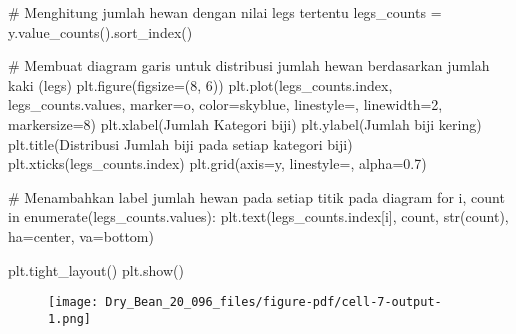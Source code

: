 \documentclass[
  letterpaper,
]{krantz}
\makeatletter
\newenvironment{Shaded}{\begin{snugshade}}{\end{snugshade}}
\newcommand{\BuiltInTok}[1]{\textcolor[rgb]{0.00,0.23,0.31}{#1}}
\newcommand{\CommentTok}[1]{\textcolor[rgb]{0.37,0.37,0.37}{#1}}
\newcommand{\ControlFlowTok}[1]{\textcolor[rgb]{0.00,0.23,0.31}{#1}}
\newcommand{\DecValTok}[1]{\textcolor[rgb]{0.68,0.00,0.00}{#1}}
\newcommand{\FloatTok}[1]{\textcolor[rgb]{0.68,0.00,0.00}{#1}}
\newcommand{\KeywordTok}[1]{\textcolor[rgb]{0.00,0.23,0.31}{#1}}
\newcommand{\NormalTok}[1]{\textcolor[rgb]{0.00,0.23,0.31}{#1}}
\newcommand{\OperatorTok}[1]{\textcolor[rgb]{0.37,0.37,0.37}{#1}}
\newcommand{\StringTok}[1]{\textcolor[rgb]{0.13,0.47,0.30}{#1}}
\newenvironment{kframe}{%
\medskip{}
\setlength{\fboxsep}{.8em}
 \def\at@end@of@kframe{}%
 \ifinner\ifhmode%
  \def\at@end@of@kframe{\end{minipage}}%
  \begin{minipage}{\columnwidth}%
 \fi\fi%
 \def\FrameCommand##1{\hskip\@totalleftmargin \hskip-\fboxsep
 \colorbox{shadecolor}{##1}\hskip-\fboxsep
     \hskip-\linewidth \hskip-\@totalleftmargin \hskip\columnwidth}%
 \MakeFramed {\advance\hsize-\width
   \@totalleftmargin\z@ \linewidth\hsize
   \@setminipage}}%
 {\par\unskip\endMakeFramed%
 \at@end@of@kframe}
\renewenvironment{Shaded}{\begin{kframe}}{\end{kframe}}
\makeatother
\begin{document}
\begin{Shaded}
\begin{Highlighting}[]
\CommentTok{\# Menghitung jumlah hewan dengan nilai legs tertentu}
\NormalTok{legs\_counts }\OperatorTok{=}\NormalTok{ y.value\_counts().sort\_index()}

\CommentTok{\# Membuat diagram garis untuk distribusi jumlah hewan berdasarkan jumlah kaki (legs)}
\NormalTok{plt.figure(figsize}\OperatorTok{=}\NormalTok{(}\DecValTok{8}\NormalTok{, }\DecValTok{6}\NormalTok{))}
\NormalTok{plt.plot(legs\_counts.index, legs\_counts.values, marker}\OperatorTok{=}\StringTok{\textquotesingle{}o\textquotesingle{}}\NormalTok{, color}\OperatorTok{=}\StringTok{\textquotesingle{}skyblue\textquotesingle{}}\NormalTok{, linestyle}\OperatorTok{=}\StringTok{\textquotesingle{}{-}\textquotesingle{}}\NormalTok{, linewidth}\OperatorTok{=}\DecValTok{2}\NormalTok{, markersize}\OperatorTok{=}\DecValTok{8}\NormalTok{)}
\NormalTok{plt.xlabel(}\StringTok{\textquotesingle{}Jumlah Kategori biji\textquotesingle{}}\NormalTok{)}
\NormalTok{plt.ylabel(}\StringTok{\textquotesingle{}Jumlah biji kering\textquotesingle{}}\NormalTok{)}
\NormalTok{plt.title(}\StringTok{\textquotesingle{}Distribusi Jumlah biji pada setiap kategori biji\textquotesingle{}}\NormalTok{)}
\NormalTok{plt.xticks(legs\_counts.index)}
\NormalTok{plt.grid(axis}\OperatorTok{=}\StringTok{\textquotesingle{}y\textquotesingle{}}\NormalTok{, linestyle}\OperatorTok{=}\StringTok{\textquotesingle{}{-}{-}\textquotesingle{}}\NormalTok{, alpha}\OperatorTok{=}\FloatTok{0.7}\NormalTok{)}

\CommentTok{\# Menambahkan label jumlah hewan pada setiap titik pada diagram}
\ControlFlowTok{for}\NormalTok{ i, count }\KeywordTok{in} \BuiltInTok{enumerate}\NormalTok{(legs\_counts.values):}
\NormalTok{    plt.text(legs\_counts.index[i], count, }\BuiltInTok{str}\NormalTok{(count), ha}\OperatorTok{=}\StringTok{\textquotesingle{}center\textquotesingle{}}\NormalTok{, va}\OperatorTok{=}\StringTok{\textquotesingle{}bottom\textquotesingle{}}\NormalTok{)}

\NormalTok{plt.tight\_layout()}
\NormalTok{plt.show()}
\end{Highlighting}
\end{Shaded}

\begin{figure}[H]

{\centering \texttt{[image: Dry\_Bean\_20\_096\_files/figure-pdf/cell-7-output-1.png]}

}

\end{figure}
\end{document}
